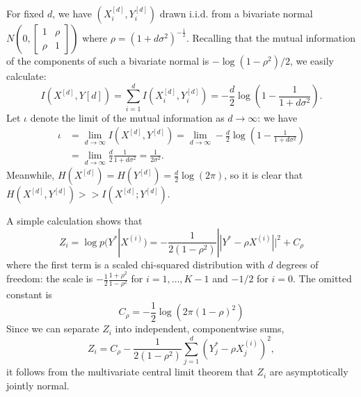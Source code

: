 \documentclass[12pt]{article}
\begin{document}
For fixed $d$, we have $(X_i^{[d]}, Y_i^{[d]})$ drawn i.i.d. from a
bivariate normal $N(0, \begin{bmatrix}1 & \rho\\\rho &
1\end{bmatrix})$ where $\rho = (1 + d\sigma^2)^{-\frac{1}{2}}$.  Recalling that
the mutual information of the components of such a bivariate normal is
$-\log(1 - \rho^2)/2$, we easily calculate:
\[
I(X^{[d]}, Y{[d]}) = \sum_{i=1}^d I(X_i^{[d]}, Y_i^{[d]}) = -\frac{d}{2}\log(1 - \frac{1}{1+d\sigma^2}).
\]
Let $\iota$ denote the limit of the mutual information as $d \to \infty$: we have
\begin{align*}
\iota &= \lim_{d \to \infty} I(X^{[d]}, Y^{[d]}) =
\lim_{d \to \infty} -\frac{d}{2}\log(1 - \frac{1}{1+d\sigma^2}) 
\\&= \lim_{d \to \infty}\frac{d}{2}\frac{1}{1+d\sigma^2} = \frac{1}{2\sigma^2}.
\end{align*}
Meanwhile, $H(X^{[d]}) = H(Y^{[d]}) = \frac{d}{2}\log(2\pi)$, so it is clear that $H(X^{[d]}, Y^{[d]}) >> I(X^{[d]}; Y^{[d]})$.

A simple calculation shows that
\[
Z_i = \log p(Y^*|X^{(i)}) = -\frac{1}{2(1-\rho^2)}||Y^* -\rho X^{(i)} ||^2 + C_\rho
\]
where the first term is a scaled chi-squared distribution with $d$
degrees of freedom: the scale is $-\frac{1}{2}\frac{1 + \rho^2}{1-\rho^2}$ for $i = 1,\hdots, K-1$ and
$-1/2$ for $i = 0$.  
The omitted constant is
\[
C_\rho = -\frac{1}{2}\log(2\pi(1-\rho)^2)
\]
Since we can separate $Z_i$ into
independent, componentwise sums,
\[
Z_i = C_\rho -\frac{1}{2(1-\rho^2)} \sum_{j=1}^d (Y^*_j - \rho X^{(i)}_j)^2,
\]
it follows from the multivariate central limit theorem that $Z_i$ are asymptotically jointly normal.
\end{document}
